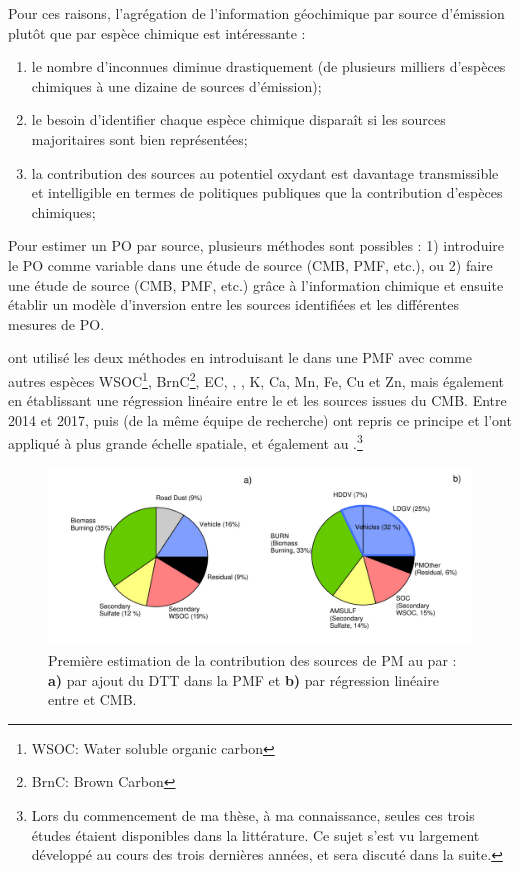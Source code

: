 Pour ces raisons, l'agrégation de l'information géochimique par source d'émission plutôt
que par espèce chimique est intéressante :
\begin{enumerate}
    \item le nombre d'inconnues diminue drastiquement (de plusieurs milliers d'espèces
        chimiques à une dizaine de sources d'émission);
    \item le besoin d'identifier chaque espèce chimique disparaît si les sources
        majoritaires sont bien représentées;
    \item la contribution des sources au potentiel oxydant est davantage transmissible et
        intelligible en termes de politiques publiques que la contribution d'espèces
        chimiques;
\end{enumerate}

Pour estimer un PO par source, plusieurs méthodes sont possibles : 1) introduire le PO
comme variable dans une étude de source (CMB, PMF, etc.), ou 2) faire une étude de source
(CMB, PMF, etc.) grâce à l'information chimique et ensuite établir un modèle d'inversion
entre les sources identifiées et les différentes mesures de PO.

\cite{vermaReactive2014} ont utilisé les deux méthodes en introduisant le \PODTT{} dans une
PMF avec comme autres espèces WSOC\footnote{WSOC: Water soluble organic carbon},
BrnC\footnote{BrnC: Brown Carbon}, EC, \SOq, \NHt, K, Ca, Mn, Fe, Cu et Zn, mais également
en établissant une régression linéaire entre le \PODTT{} et les sources issues du CMB.
Entre 2014 et 2017, \cite{batesReactive2015} puis \cite{fangOxidative2016} (de la même
équipe de recherche) ont repris ce principe et l'ont appliqué à plus grande échelle
spatiale, et également au \POAAv.\footnote{Lors du commencement de ma thèse, à ma
    connaissance, seules ces trois études étaient disponibles dans la littérature. Ce sujet
s'est vu largement développé au cours des trois dernières années, et sera discuté dans la
suite.}

\begin{figure}[ht]
    \centering
    \includegraphics[width=1.0\linewidth]{figures/chapter04/verma_2014_fig8.pdf}
    \caption{Première estimation de la contribution des sources de PM au \PODTT{} par
        \cite[][figure 8]{vermaReactive2014}: \textbf{a)} par ajout du DTT dans la PMF et
        \textbf{b)} par régression linéaire entre \PODTT{} et CMB.
    }%
    \label{fig:figures/chapter04/verma_2014_fig8}
\end{figure}

